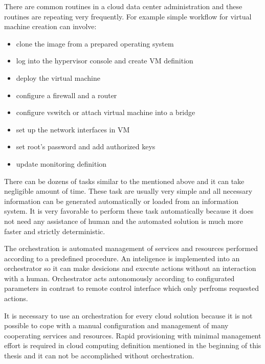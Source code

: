 
There are common routines in a cloud data center administration and these routines are repeating very frequently. For example simple workflow for virtual machine creation can involve:
\begin{itemize}
	\item clone the image from a prepared operating system
	\item log into the hypervisor console and create \Ac{VM} definition
	\item deploy the virtual machine 
	\item configure a firewall and a router 
	\item configure vswitch or attach virtual machine into a bridge
	\item set up the network interfaces in \Ac{VM}
	\item set root's password and add authorized keys
	\item update monitoring definition
\end{itemize}

There can be dozens of tasks similar to the mentioned above and it can take negligible amount of time. These task are usually very simple and all necessary information can be generated automatically or loaded from an information system. It is very favorable to perform these task automatically because it does not need any assistance of human and the automated solution is much more faster and strictly deterministic.

The orchestration is automated management of services and resources performed according to a predefined procedure. An inteligence is implemented into an orchestrator so it can make desicions and execute actions without an interaction with a human. Orchestrator acts autonomously according to configurated parameters in contrast to remote control interface which only perfroms requested actions.

It is necessary to use an orchestration for every cloud solution because it is not possible to cope with a manual configuration and management of many cooperating services and resources. Rapid provisioning with minimal management effort is required in cloud computing definition mentioned in the beginning of this thesis and it can not be accomplished without orchestration.

